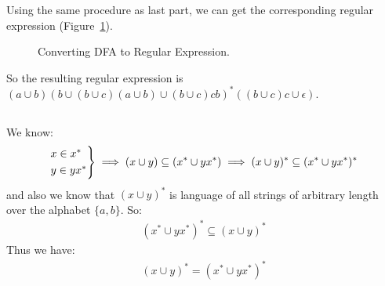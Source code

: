 \documentclass{article}
\numberwithin{equation}{subsection}
\begin{document}
\subsubsection{}
Using the same procedure as last part, we can get the corresponding regular expression (Figure~\ref{fig:automata3-2-2}).
\begin{figure}
\centering  
\begin{subfigure}[b]{\textwidth}
\centering

\end{subfigure}

\medskip
\centering  
\begin{subfigure}[b]{\textwidth}
\centering

\end{subfigure}

\medskip
\begin{subfigure}[b]{\textwidth}
\centering

\end{subfigure}

\medskip
\begin{subfigure}[b]{\textwidth}
\centering

\end{subfigure}

\medskip
\begin{subfigure}[b]{\textwidth}
\centering

\end{subfigure}
\caption{Converting DFA to Regular Expression.}
\label{fig:automata3-2-2}
\end{figure}

\pagebreak
So the resulting regular expression is \((a\cup b)(b\cup (b\cup c)(a\cup b)\cup (b\cup c)cb)^*((b\cup c)c\cup \epsilon)\).
\subsection{}
\subsubsection{}
We know:
\begin{align}
\begin{rcases*}
x \in x^*\\
y \in yx^*
\end{rcases*}
\implies (x\cup y) \subseteq (x^*\cup yx^*) \implies (x\cup y)^* \subseteq (x^*\cup yx^*)^*
\end{align}
and also we know that \((x\cup y)^*\) is language of all strings of arbitrary length over the alphabet \(\{a, b\}\).
So:
\begin{align}
    (x^*\cup yx^*)^* \subseteq (x\cup y)^* 
\end{align}
Thus we have:
\begin{align}
    (x\cup y)^* = (x^*\cup yx^*)^*
\end{align}
\end{document}
